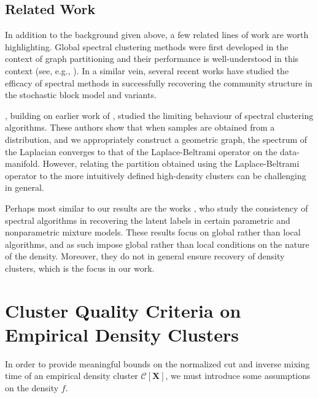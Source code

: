 \documentclass{article}
\newcommand{\1}{\mathbf{1}}
\newcommand{\Xbf}{\mathbf{X}}
\newcommand{\Cset}{\mathcal{C}}
\theoremstyle{aldenthm}
\theoremstyle{aldenrmrk}
\begin{document}
\subsection{Related Work}

In addition to the background given above, a few related lines of work are worth
highlighting. Global spectral clustering methods were first developed in the
context of graph partitioning \citep{fiedler1973,donath1973} and their
performance is well-understood in this context (see, e.g.,
\citealt{tolliver2006,luxburg2007}).  In a similar vein, several recent works
\citep{mcsherry2001,rohe2011,kamalika2012,balakrishnan2011,lei2015,abbe2018} 
have studied the efficacy of spectral methods in successfully recovering the
community structure in the stochastic block model and variants.

\citet{vonluxburg2008,hein2005}, building on earlier work of
\citet{koltchinskii2000}, studied the limiting behaviour of spectral clustering
algorithms. These authors show that when samples are obtained from a
distribution, and we appropriately construct a geometric graph, the spectrum of
the Laplacian converges to that of the Laplace-Beltrami operator on the
data-manifold. However, relating the partition obtained using the
Laplace-Beltrami operator to the more intuitively defined high-density
clusters can be challenging in general.

Perhaps most similar to our results are the works
\citet{vempala2004,shi2009,schiebinger2015}, who study the consistency of
spectral algorithms in recovering the latent labels in certain parametric and
nonparametric mixture models. These results focus on global rather than local
algorithms, and as such impose global rather than local conditions on the nature
of the density. Moreover, they do not in general ensure recovery of density
clusters, which is the focus in our work. 

\section{Cluster Quality Criteria on Empirical Density Clusters} 
\label{sec: PhiPsi}

In order to provide meaningful bounds on the normalized cut and inverse mixing time of an empirical density cluster $\Cset[\Xbf]$, we must introduce some assumptions on the density $f$. 
\end{document}
